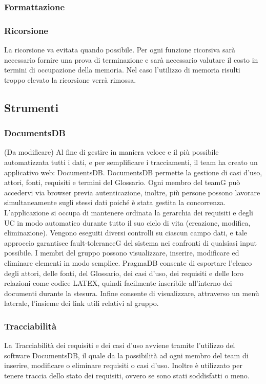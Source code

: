 \subsubsection{Formattazione}

\subsubsection{Ricorsione}
La ricorsione va evitata quando possibile. Per ogni funzione ricorsiva sarà necessario fornire una prova di terminazione e sarà necessario valutare il costo in termini di occupazione della memoria. Nel caso l'utilizzo di memoria risulti troppo elevato la ricorsione verrà rimossa.

\subsection{Strumenti}

\subsubsection{DocumentsDB}(Da modificare)
Al fine di gestire in maniera veloce e il più possibile automatizzata tutti i dati, e
per semplificare i tracciamenti, il team ha creato un applicativo web: DocumentsDB.
DocumentsDB permette la gestione di casi d’uso, attori, fonti, requisiti e termini del Glossario. Ogni membro del teamG può accedervi via browser previa autenticazione, inoltre, più persone possono lavorare simultaneamente sugli stessi dati poiché è stata gestita la concorrenza. L’applicazione si occupa di mantenere ordinata la gerarchia dei requisiti e degli UC in modo automatico durante tutto il suo ciclo di vita (creazione, modifica, eliminazione).
Vengono eseguiti diversi controlli su ciascun campo dati, e tale approccio garantisce fault-toleranceG del sistema nei confronti di qualsiasi input possibile. I membri del gruppo possono visualizzare, inserire, modificare ed eliminare elementi in modo semplice. PragmaDB consente di esportare l’elenco degli attori, delle fonti, del Glossario, dei casi d’uso, dei requisiti e delle loro relazioni come codice LATEX, quindi facilmente inseribile all’interno dei documenti durante la stesura. Infine consente di visualizzare,
attraverso un menù laterale, l’insieme dei link utili relativi al gruppo.

\subsubsection{Tracciabilità}
La Tracciabilità dei requisiti e dei casi d'uso avviene tramite l'utilizzo del software DocumentsDB, il quale da la possibilità ad ogni membro del team di inserire, modificare o eliminare requisiti o casi d’uso. Inoltre è utilizzato per tenere traccia dello stato dei requisiti, ovvero se sono stati soddisfatti o meno.

